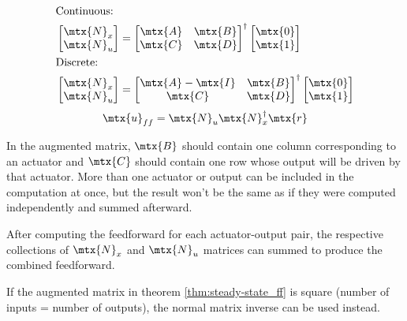 \begin{theorem}
  \label{thm:steady-state_ff}
  \begin{align}
    &\text{Continuous:} \nonumber \\
    &\begin{bmatrix}
      \mtx{N}_x \\
      \mtx{N}_u
    \end{bmatrix} =
    \begin{bmatrix}
      \mtx{A} & \mtx{B} \\
      \mtx{C} & \mtx{D}
    \end{bmatrix}^{\dagger}
    \begin{bmatrix}
      \mtx{0} \\
      \mtx{1}
    \end{bmatrix} \\
    &\text{Discrete:} \nonumber \\
    &\begin{bmatrix}
      \mtx{N}_x \\
      \mtx{N}_u
    \end{bmatrix} =
    \begin{bmatrix}
      \mtx{A} - \mtx{I} & \mtx{B} \\
      \mtx{C} & \mtx{D}
    \end{bmatrix}^{\dagger}
    \begin{bmatrix}
      \mtx{0} \\
      \mtx{1}
    \end{bmatrix}
  \end{align}
  \begin{equation}
    \mtx{u}_{ff} = \mtx{N}_u \mtx{N}_x^\dagger \mtx{r}
  \end{equation}

  In the augmented matrix, $\mtx{B}$ should contain one column corresponding to
  an actuator and $\mtx{C}$ should contain one row whose \gls{output} will be
  driven by that actuator. More than one actuator or output can be included in
  the computation at once, but the result won't be the same as if they were
  computed independently and summed afterward.

  After computing the feedforward for each actuator-output pair, the respective
  collections of $\mtx{N}_x$ and $\mtx{N}_u$ matrices can summed to produce the
  combined feedforward.
\end{theorem}

If the augmented matrix in theorem \ref{thm:steady-state_ff} is square (number
of \glspl{input} = number of \glspl{output}), the normal matrix inverse can be
used instead.

